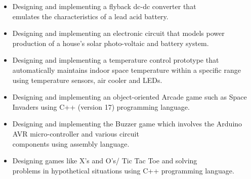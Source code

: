\documentclass[10pt,a4paper,ragged2e]{altacv}
\begin{document}






\begin{itemize}
    \item Designing and implementing a flyback dc-dc converter that\\ emulates the characteristics of a lead acid battery.
    \item Designing and implementing an electronic circuit that models power production of a house's solar photo-voltaic and battery system.
     \item Designing and implementing a temperature control prototype that automatically maintains indoor space temperature within a specific range using temperature sensors, air cooler and LEDs.
\end{itemize}


\begin{itemize}
    \item Designing and implementing an object-oriented Arcade game such as Space Invaders using C++ (version 17) programming language.
    \item Designing and implementing the Buzzer game which involves the Arduino AVR micro-controller and various circuit\\ components using assembly language.
    \item Designing games like X’s and O’s/ Tic Tac Toe and solving \\ problems in hypothetical situations using C++ programming language.
\end{itemize}

\nocite{*}



\end{document}
